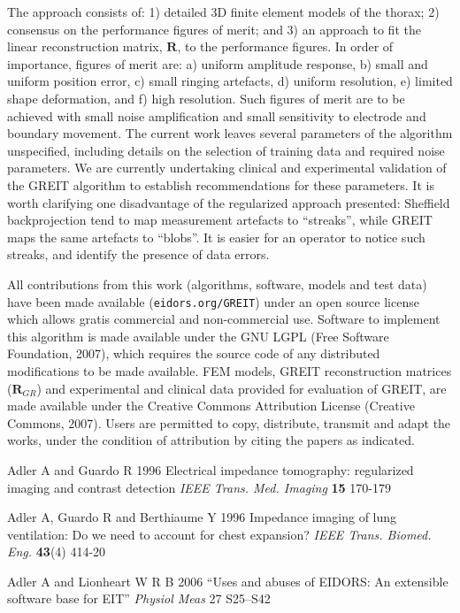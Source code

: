 \documentclass[12pt]{iopart}
\newcommand{\RB}{\mbox{$\mathbf{R}$}}
\begin{document}
The approach consists of:
1) detailed 3D finite element models of the thorax;
2) consensus on the performance figures of merit;
and
3) an approach to fit the linear reconstruction
 matrix, $\RB$, to the performance figures.
In order of importance, figures of merit are:
a) uniform amplitude response,
b) small and uniform position error,
c) small ringing artefacts,
d) uniform resolution,
e) limited shape deformation, and
f) high resolution.
Such figures of merit are to be achieved with
small noise amplification and
small sensitivity to electrode and boundary movement.
The current work leaves several parameters of the algorithm
unspecified, including details on the selection of training
data and required noise parameters. We are currently undertaking
clinical and experimental validation of the GREIT algorithm
to establish recommendations for these parameters.
It is worth clarifying one disadvantage of the regularized
approach presented: Sheffield backprojection tend to map
measurement artefacts to ``streaks'', while GREIT maps the same
artefacts to ``blobs''. It is easier for an operator to notice
such streaks, and identify the presence of data errors.

All contributions from this work
(algorithms, software, models and test data)
 have been made available (\verb+eidors.org/GREIT+) 
under an open source license which allows
gratis commercial and non-commercial use.
Software to implement this algorithm is made
available under the GNU LGPL (Free Software Foundation, 2007),
which requires the source code of any distributed
 modifications to be made available.
FEM models, GREIT reconstruction matrices ($\RB_{GR}$) and
experimental and clinical data provided for evaluation of GREIT,
are made available under the Creative Commons Attribution
License (Creative Commons, 2007). Users are permitted
to copy, distribute, transmit and adapt the works,
under the condition of attribution by citing the
papers as indicated.



\References %
\item[]
Adler A and Guardo R 1996 Electrical impedance tomography:
regularized imaging and contrast detection {\em IEEE Trans. Med.
Imaging} {\bf 15} 170-179

\item[]
Adler A, Guardo R and Berthiaume Y 1996 Impedance imaging of lung
ventilation: Do we need to account for chest expansion? {\em IEEE
Trans. Biomed. Eng.} {\bf 43}(4) 414-20


\item[]
Adler A and Lionheart W R B 2006
``Uses and abuses of EIDORS: An extensible software base for EIT''
{\em Physiol Meas}
27 S25--S42
\end{document}
